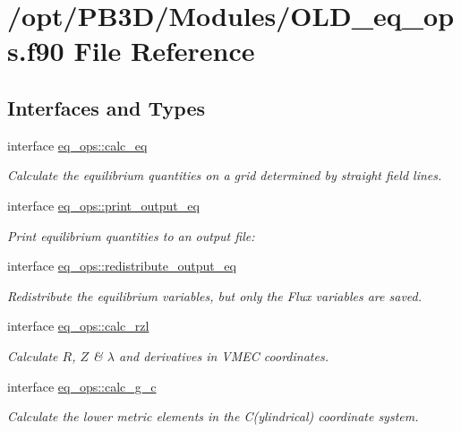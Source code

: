 \hypertarget{OLD__eq__ops_8f90}{}\section{/opt/\+P\+B3\+D/\+Modules/\+O\+L\+D\+\_\+eq\+\_\+ops.f90 File Reference}
\label{OLD__eq__ops_8f90}
\subsection*{Interfaces and Types}
\begin{DoxyCompactItemize}
\item 
interface \hyperlink{interfaceeq__ops_1_1calc__eq}{eq\+\_\+ops\+::calc\+\_\+eq}
\begin{DoxyCompactList}\small\item\em Calculate the equilibrium quantities on a grid determined by straight field lines. \end{DoxyCompactList}\item 
interface \hyperlink{interfaceeq__ops_1_1print__output__eq}{eq\+\_\+ops\+::print\+\_\+output\+\_\+eq}
\begin{DoxyCompactList}\small\item\em Print equilibrium quantities to an output file\+: \end{DoxyCompactList}\item 
interface \hyperlink{interfaceeq__ops_1_1redistribute__output__eq}{eq\+\_\+ops\+::redistribute\+\_\+output\+\_\+eq}
\begin{DoxyCompactList}\small\item\em Redistribute the equilibrium variables, but only the Flux variables are saved. \end{DoxyCompactList}\item 
interface \hyperlink{interfaceeq__ops_1_1calc__rzl}{eq\+\_\+ops\+::calc\+\_\+rzl}
\begin{DoxyCompactList}\small\item\em Calculate $R$, $Z$ \& $\lambda$ and derivatives in V\+M\+EC coordinates. \end{DoxyCompactList}\item 
interface \hyperlink{interfaceeq__ops_1_1calc__g__c}{eq\+\_\+ops\+::calc\+\_\+g\+\_\+c}
\begin{DoxyCompactList}\small\item\em Calculate the lower metric elements in the C(ylindrical) coordinate system. \end{DoxyCompactList}\item 

\end{DoxyCompactItemize}
